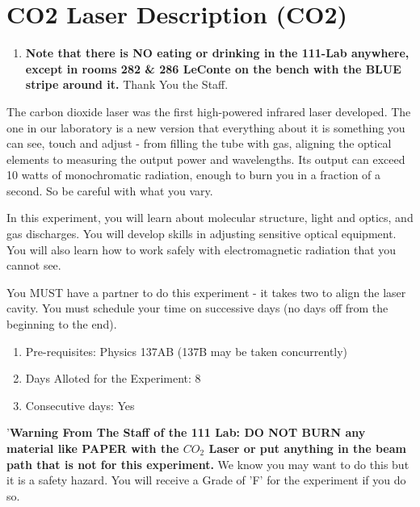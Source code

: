 \documentclass{../lab}
\begin{document}
\maketitle

\tableofcontents
\section{CO2 Laser Description (CO2)}

\begin{enumerate}
    \item \textbf{Note that there is NO eating or drinking in the 111-Lab anywhere, except in rooms 282 \& 286 LeConte on the bench with the BLUE stripe around it.} Thank You the Staff.
\end{enumerate}

The carbon dioxide laser was the first high-powered infrared laser developed. The one in our laboratory is a new version that everything about it is something you can see, touch and adjust - from filling the tube with gas, aligning the optical elements to measuring the output power and wavelengths. Its output can exceed 10 watts of monochromatic radiation, enough to burn you in a fraction of a second. So be careful with what you vary.

In this experiment, you will learn about molecular structure, light and optics, and gas discharges. You will develop skills in adjusting sensitive optical equipment. You will also learn how to work safely with electromagnetic radiation that you cannot see.

You MUST have a partner to do this experiment - it takes two to align the laser cavity. You must schedule your time on successive days (no days off from the beginning to the end).

\begin{enumerate}
    \item Pre-requisites: Physics 137AB (137B may be taken concurrently)
    \item Days Alloted for the Experiment: 8
    \item Consecutive days: Yes
\end{enumerate}

'\textbf{Warning From The Staff of the 111 Lab: DO NOT BURN any material like PAPER with the $CO_2 $ Laser or put anything in the beam path that is not for this experiment.} We know you may want to do this but it is a safety hazard. You will receive a Grade of 'F' for the experiment if you do so.
\end{document}
